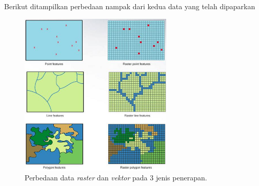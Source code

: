 Berikut ditampilkan perbedaan nampak dari kedua data yang telah dipaparkan
		\begin{figure}[htbp]
		\centering
		\includegraphics[width=0.65\textwidth]{pictures/perbedaan.jpg}
		\caption{Perbedaan data \textit{raster} dan \textit{vektor} pada 3 jenis penerapan.}
		\label{labelgambar5}
		\end{figure}



